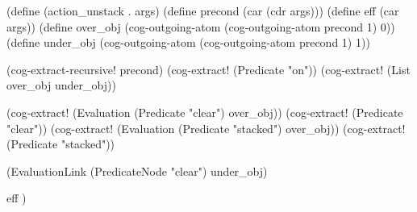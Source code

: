 \begin{python}
(define (action_unstack . args)
  (define precond (car (cdr args)))
  (define eff (car args))
  (define over_obj 
    (cog-outgoing-atom (cog-outgoing-atom precond 1) 0))
  (define under_obj 
    (cog-outgoing-atom (cog-outgoing-atom precond 1) 1))

  (cog-extract-recursive! precond)
  (cog-extract! (Predicate "on"))
  (cog-extract! (List over_obj under_obj))

  (cog-extract! (Evaluation (Predicate "clear") over_obj))
  (cog-extract! (Predicate "clear"))
  (cog-extract! (Evaluation (Predicate "stacked") over_obj))
  (cog-extract! (Predicate "stacked"))

  (EvaluationLink (PredicateNode "clear") under_obj)

  eff
)


\end{python}
